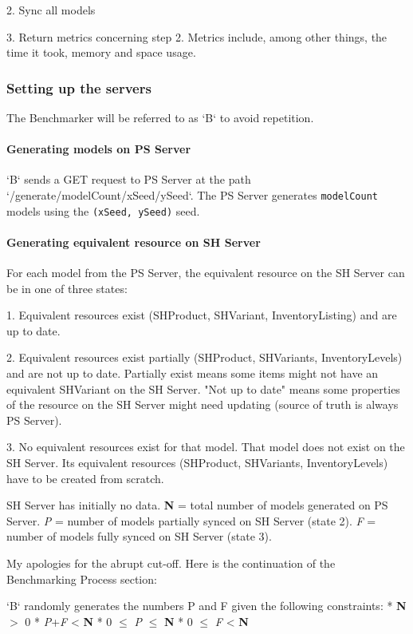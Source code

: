 2. Sync all models

3. Return metrics concerning step 2. Metrics include, among other things, the time it took, memory and space usage.


\subsubsection{Setting up the servers}
The Benchmarker will be referred to as `B` to avoid repetition.

\paragraph{Generating models on PS Server}
`B` sends a GET request to PS Server at the path `/generate/modelCount/xSeed/ySeed`. The PS Server generates \texttt{modelCount} models using the \texttt{(xSeed, ySeed)} seed.

\paragraph{Generating equivalent resource on SH Server}
For each model from the PS Server, the equivalent resource on the SH Server can be in one of three states:

1. Equivalent resources exist (SHProduct, SHVariant, InventoryListing) and are up to date.

2. Equivalent resources exist partially (SHProduct, SHVariants, InventoryLevels) and are not up to date. Partially exist means some items might not have an equivalent SHVariant on the SH Server. "Not up to date" means some properties of the resource on the SH Server might need updating (source of truth is always PS Server).

3. No equivalent resources exist for that model. That model does not exist on the SH Server. Its equivalent resources (SHProduct, SHVariants, InventoryLevels) have to be created from scratch.

SH Server has initially no data. \textbf{N} = total number of models generated on PS Server. \textit{P} = number of models partially synced on SH Server (state 2). \textit{F} = number of models fully synced on SH Server (state 3).

My apologies for the abrupt cut-off. Here is the continuation of the Benchmarking Process section:

`B` randomly generates the numbers P and F given the following constraints:
* \textbf{N} $>$ 0
* \textit{P}+\textit{F} < \textbf{N}
* 0 $\le$ \textit{P} $\le$ \textbf{N}
* 0 $\le$ \textit{F} < \textbf{N}

